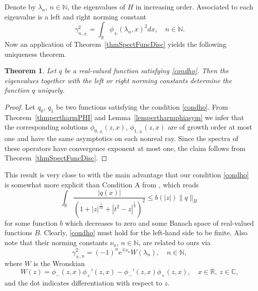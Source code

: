 \documentclass{amsart}
\newtheorem{theorem}{Theorem}[section]
\numberwithin{equation}{section}
\begin{document}
Denote by $\lambda_n$, $n\in{{\mathbb N}}$, the eigenvalues of $H$ in increasing order. Associated to each eigenvalue is a left and right norming constant
\begin{equation}
\gamma_{n,\pm}^2 = \int_{{\mathbb R}} \phi_\pm(\lambda_n,x)^2 dx, \quad n\in{{\mathbb N}}.
\end{equation}
Now an application of Theorem~\ref{thmSpectFuncDisc} yields the following uniqueness theorem.

\begin{theorem}
Let $q$ be a real-valued function satisfying \eqref{condho}.
Then the eigenvalues together with the left or right norming constants determine the function $q$ uniquely.
\end{theorem}

\begin{proof}
 Let $q_0$, $q_1$ be two functions satisfying the condition \eqref{condho}.
 From Theorem~\ref{thmpertharmPHI} and Lemma~\ref{lempertharmphiasym} we infer that the corresponding solutions $\phi_{0,\pm}(z,x)$, $\phi_{1,\pm}(z,x)$ are of growth order at most one and have the same asymptotics on each nonreal ray. Since the spectra of these operators have convergence exponent at most one, the claim follows from Theorem~\ref{thmSpectFuncDisc}.
\end{proof}

This result is very close to \cite[Theorem~1.1]{ckk} with the main advantage that our condition \eqref{condho} is somewhat more explicit than
Condition A from \cite{ckk}, which reads
\begin{equation}
\int_{{\mathbb R}} \frac{|q(x)|}{(1 + \left|z\right|^{\frac{1}{12}} + \left|t^2-z\right|^{\frac{1}{4}})^2} \le b(|z|) \|q\|_B
\end{equation}
for some function $b$ which decreases to zero and some Banach space of real-valued functions $B$. Clearly, \eqref{condho} must hold
for the left-hand side to be finite.
Also note that their norming constants $\nu_n$, $n\in{{\mathbb N}}$, are related to ours via
\begin{equation}
 \gamma_{\pm,n}^2 = (-1)^n {\mathrm{e}}^{\mp\nu_n} \dot{W}(\lambda_n), \quad n\in{{\mathbb N}},
\end{equation}
where $W$ is the Wronskian 
\begin{equation}
 W(z)= \phi_-(z,x)\phi_+'(z,x) - \phi_-'(z,x)\phi_+(z,x), \quad x\in{{\mathbb R}},~z\in{{\mathbb C}},
\end{equation}
and the dot indicates differentiation with respect to $z$.
\end{document}
